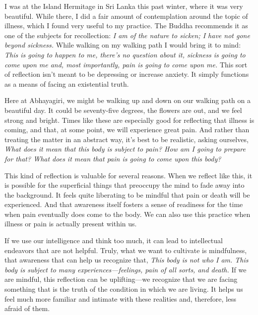 
I was at the Island Hermitage in Sri Lanka this past winter, where it 
was very beautiful. While there, I did a fair amount of contemplation 
around the topic of illness, which I found very useful to my practice. 
The Buddha recommends it as one of the subjects for recollection: 
\emph{I am of the nature to sicken; I have not gone beyond sickness.} 
While walking on my walking path I would bring it to mind: \emph{This 
is going to happen to me, there's no question about it, sickness is 
going to come upon me and, most importantly, pain is going to come upon 
me.} This sort of reflection isn't meant to be depressing or increase 
anxiety. It simply functions as a means of facing an existential truth.

Here at Abhayagiri, we might be walking up and down on our walking path 
on a beautiful day. It could be seventy-five degrees, the flowers are 
out, and we feel strong and bright. Times like these are especially 
good for reflecting that illness is coming, and that, at some point, we 
will experience great pain. And rather than treating the matter in an 
abstract way, it's best to be realistic, asking ourselves, \emph{What 
does it mean that this body is subject to pain? How am I going to 
prepare for that? What does it mean that pain is going to come upon 
this body?}

This kind of reflection is valuable for several reasons. When we 
reflect like this, it is possible for the superficial things that 
preoccupy the mind to fade away into the background. It feels quite 
liberating to be mindful that pain or death will be experienced. And 
that awareness itself fosters a sense of readiness for the time when 
pain eventually does come to the body. We can also use this practice 
when illness or pain is actually present within us.

If we use our intelligence and think too much, it can lead to 
intellectual endeavors that are not helpful. Truly, what we want to 
cultivate is mindfulness, that awareness that can help us recognize 
that, \emph{This body is not who I am. This body is subject to many 
experiences---feelings, pain of all sorts, and death.} If we are 
mindful, this reflection can be uplifting---we recognize that we are 
facing something that is the truth of the condition in which we are 
living. It helps us feel much more familiar and intimate with these 
realities and, therefore, less afraid of them.

